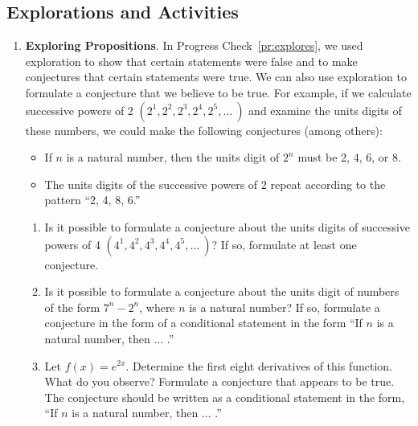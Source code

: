\subsection*{Explorations and Activities}
\setcounter{oldenumi}{\theenumi}
\begin{enumerate} \setcounter{enumi}{\theoldenumi}
  \item \textbf{Exploring Propositions}.  \label{exer11:explore}  In Progress Check~\ref{pr:explores}, we used exploration to show that certain statements were false and to make conjectures that certain statements were true.  We can also use exploration to formulate a conjecture that we believe to be true.  For example, if we calculate successive powers of 2 $\left( 2^1, 2^2, 2^3, 2^4, 2^5, \ldots \: \right)$ and examine the units digits of these numbers, we could make the following conjectures (among others):

\begin{itemize}
\item If $n$ is a natural number, then the units digit of $2^n$ must be 2, 4, 6, or 8.

\item The units digits of the successive powers of 2 repeat according to the pattern 
``2, 4, 8, 6.''
\end{itemize}

\begin{enumerate}
\item Is it possible to formulate a conjecture about the units digits of successive powers of 4 
$\left( 4^1, 4^2, 4^3, 4^4, 4^5, \ldots \: \right)$?  If so, formulate at least one conjecture.

\item Is it possible to formulate a conjecture about the units digit of numbers of the form 
$7^n - 2^n$, where $n$ is a natural number?  If so, formulate a conjecture in the form of a conditional statement in the form ``If $n$ is a natural number, then $\ldots$ .''

\item Let  $f \left( x \right) = e^{2x}$.  Determine the first eight derivatives of this function.  What do you observe?  Formulate a conjecture that appears to be true.  The conjecture should be written as a conditional statement in the form, ``If $n$ is a natural number, then 
$\ldots$ .''
\end{enumerate}
\end{enumerate}



\hbreak
\endinput

